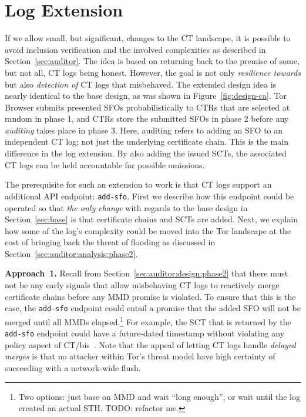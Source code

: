 \section{Log Extension} \label{sec:log}
If we allow small, but significant, changes to the CT landscape, it is possible
to avoid inclusion verification and the involved complexities as described in
Section~\ref{sec:auditor}.  The idea is based on returning back to the premise
of some, but not all, CT logs being honest.  However, the goal is not only
\emph{resilience towards} but also \emph{detection of} CT logs that misbehaved.
The extended design idea is nearly identical to the base design, as was shown in
Figure~\ref{fig:design-ca}.  Tor Browser submits presented SFOs
probabilistically to CTRs that are selected at random in phase 1, and CTRs store
the submitted SFOs in phase 2 before any \emph{auditing} takes place in phase 3.
Here, auditing refers to adding an SFO to an independent CT log; not just the
underlying certificate chain.  This is the main difference in the log extension.
By also adding the issued SCTs, the associated CT logs can be held accountable
for possible omissions.

The prerequisite for such an extension to work is that CT logs support an
additional API endpoint:
	\texttt{add-sfo}.
First we describe how this endpoint could be operated so that \emph{the only
change} with regards to the base design in Section~\ref{sec:base} is that
certificate chains and SCTs are added.  Next, we explain how some of the log's
complexity could be moved into the Tor landscape at the cost of bringing back
the threat of flooding as discussed in
Section~\ref{sec:auditor:analysis:phase2}.

\textbf{Approach~1.}
Recall from Section~\ref{sec:auditor:design:phase2} that there must not be any
early signals that allow misbehaving CT logs to reactively merge certificate
chains before any MMD promise is violated.  To ensure that this is the case, the
\texttt{add-sfo} endpoint could entail a promise that the added SFO will not be
merged until all MMDs elapsed.\footnote{%
	Two options: just base on MMD and wait ``long enough'', or wait until the
	log created an actual STH.  TODO: refactor me.
} For example, the SCT that is returned by the \texttt{add-sfo} endpoint could
have a future-dated timestamp without violating any policy aspect of
CT/bis~\cite{ct/bis}.  Note that the appeal of letting CT logs handle
\emph{delayed merges} is that no attacker within Tor's threat model have high
certainty of succeeding with a network-wide flush.

